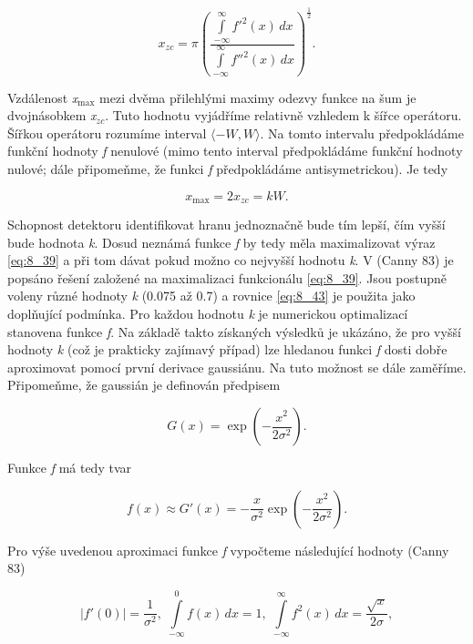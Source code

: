 \begin{equation} \label{eq:8_42}
    x_{zc} = \pi \left( \frac{\int\limits_{-\infty}^{\infty} f'^2(x)\,dx}{\int\limits_{-\infty}^{\infty} f''^2(x)\,dx} \right)^{\frac{1}{2}}.
\end{equation}

Vzdálenost \textit{x}$_{\max}$ mezi dvěma přilehlými maximy odezvy funkce na šum je dvojnásobkem \textit{x}$_{zc}$. Tuto hodnotu vyjádříme relativně vzhledem k šířce operátoru. Šířkou operátoru rozumíme interval $\langle-W, W\rangle$. Na tomto intervalu předpokládáme funkční hodnoty \textit{f} nenulové (mimo tento interval předpokládáme funkční hodnoty nulové; dále připomeňme, že funkci \textit{f} předpokládáme antisymetrickou). Je tedy

\begin{equation} \label{eq:8_43}
    x_{\max} = 2 x_{zc} = kW.
\end{equation}

Schopnost detektoru identifikovat hranu jednoznačně bude tím lepší, čím vyšší bude hodnota \textit{k}. Dosud neznámá funkce \textit{f} by tedy měla maximalizovat výraz \eqref{eq:8_39} a při tom dávat pokud možno co nejvyšší hodnotu \textit{k}. V (Canny 83) je popsáno řešení založené na maximalizaci funkcionálu \eqref{eq:8_39}. Jsou postupně voleny různé hodnoty \textit{k} (0.075 až 0.7) a rovnice \eqref{eq:8_43} je použita jako doplňující podmínka. Pro každou hodnotu \textit{k} je numerickou optimalizací stanovena funkce \textit{f}. Na základě takto získaných výsledků je ukázáno, že pro vyšší hodnoty \textit{k} (což je prakticky zajímavý případ) lze hledanou funkci \textit{f} dosti dobře aproximovat pomocí první derivace gaussiánu. Na tuto možnost se dále zaměříme. Připomeňme, že gaussián je definován předpisem

\begin{equation} \label{eq:8_44}
    G(x) = \exp \left( - \frac{x^2}{2\sigma^2} \right).
\end{equation}

Funkce \textit{f} má tedy tvar

\begin{equation} \label{eq:8_45}
    f(x) \approx G'(x) = -\frac{x}{\sigma^2} \exp \left( - \frac{x^2}{2\sigma^2} \right).
\end{equation}

Pro výše uvedenou aproximaci funkce \textit{f} vypočteme následující hodnoty (Canny 83)

\begin{equation} \label{eq:8_46}
    |f'(0)| = \frac{1}{\sigma^2}, \; \int\limits_{-\infty}^{0} f(x)\,dx = 1, \; \int\limits_{-\infty}^{\infty} f^2(x)\,dx = \frac{\sqrt{x}}{2\sigma},
\end{equation}


